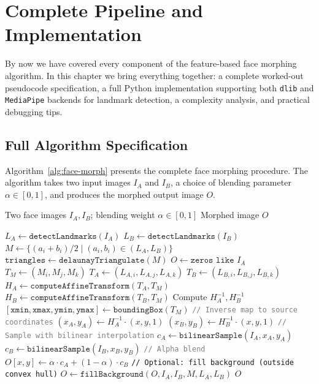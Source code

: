 \section{Complete Pipeline and Implementation}

By now we have covered every component of the feature-based face morphing algorithm. In this chapter we bring everything together: a complete worked-out pseudocode specification, a full Python implementation supporting both \texttt{dlib} and \texttt{MediaPipe} backends for landmark detection, a complexity analysis, and practical debugging tips.

\subsection{Full Algorithm Specification}

Algorithm~\ref{alg:face-morph} presents the complete face morphing procedure. The algorithm takes two input images $I_A$ and $I_B$, a choice of blending parameter $\alpha \in [0,1]$, and produces the morphed output image $O$.

\begin{algorithm}[t]
\caption{Feature-Based Face Morphing}
\label{alg:face-morph}
\begin{algorithmic}[1]
\Require Two face images $I_A, I_B$; blending weight $\alpha \in [0,1]$
\Ensure Morphed image $O$

\State $L_A \gets \texttt{detectLandmarks}(I_A)$ 
\State $L_B \gets \texttt{detectLandmarks}(I_B)$
\State $M \gets \{(a_i + b_i)/2 \mid (a_i, b_i) \in (L_A, L_B)\}$ 
\State $\texttt{triangles} \gets \texttt{delaunayTriangulate}(M)$
\State $O \gets \texttt{zeros like } I_A$
    \State $T_M \gets (M_i, M_j, M_k)$ 
    \State $T_A \gets (L_{A,i}, L_{A,j}, L_{A,k})$
    \State $T_B \gets (L_{B,i}, L_{B,j}, L_{B,k})$
    \State $H_A \gets \texttt{computeAffineTransform}(T_A, T_M)$
    \State $H_B \gets \texttt{computeAffineTransform}(T_B, T_M)$
    \State Compute $H_A^{-1}, H_B^{-1}$ 
    \State $[\texttt{xmin}, \texttt{xmax}, \texttt{ymin}, \texttt{ymax}] \gets \texttt{boundingBox}(T_M)$
            \State \textcolor{gray}{\texttt{// Inverse map to source coordinates}}
            \State $(x_A, y_A) \gets H_A^{-1} \cdot (x, y, 1)$
            \State $(x_B, y_B) \gets H_B^{-1} \cdot (x, y, 1)$
            \State \textcolor{gray}{\texttt{// Sample with bilinear interpolation}}
            \State $c_A \gets \texttt{bilinearSample}(I_A, x_A, y_A)$
            \State $c_B \gets \texttt{bilinearSample}(I_B, x_B, y_B)$
            \State \textcolor{gray}{\texttt{// Alpha blend}}
            \State $O[x,y] \gets \alpha \cdot c_A + (1-\alpha) \cdot c_B$
        \EndFor
    \EndFor
\EndFor
\State \texttt{// Optional: fill background (outside convex hull)}
\State $O \gets \texttt{fillBackground}(O, I_A, I_B, M, L_A, L_B)$
\State \Return $O$
\end{algorithmic}
\end{algorithm}

